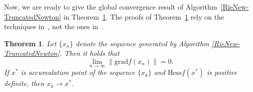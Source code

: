\documentclass[11pt]{article}
\newtheorem{theorem}{Theorem}[section]
\numberwithin{equation}{section}
\begin{document}

Now, we are ready to give the global convergence result of Algorithm~\ref{RieNew-TruncatedNewton} in Theorem~\ref{RieNew-GlobalConver}. The proofs of Theorem~\ref{RieNew-GlobalConver} rely on the techniques in~\cite{huang_riemannian_2018}, not the ones in~\cite{dembo_truncated-newton_1983}.
\begin{theorem} \label{RieNew-GlobalConver}
  Let $\{x_n\}$ denote the sequence generated by Algorithm \ref{RieNew-TruncatedNewton}. Then it holds that
  \[
    \lim_{n \rightarrow \infty}\|\mathrm{grad}f(x_n)\|=0.
    \]
 If $x^*$ is accumulation point of the sequence $\{x_k\}$ and $\mathrm{Hess}f(x^*)$ is positive definite, then $x_k \rightarrow x^*$.
\end{theorem}
\end{document}
